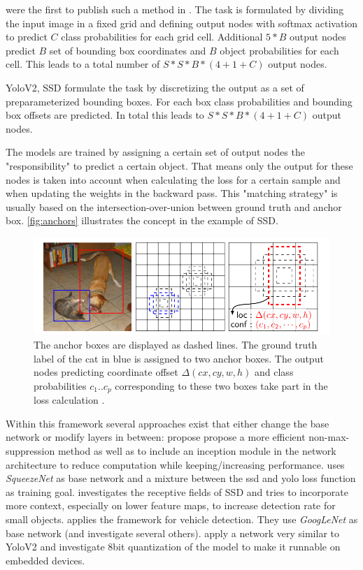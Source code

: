 	\citeauthor{Redmon} were the first to publish such a method in \cite{Redmon}. The task is formulated by dividing the input image in a fixed grid and defining output nodes with softmax activation to predict $C$ class probabilities for each grid cell. Additional $5*B$ output nodes predict $B$ set of bounding box coordinates and $B$ object probabilities for each cell. This leads to a total number of $S*S*B*(4 + 1 + C)$ output nodes. 
	
	YoloV2, SSD  formulate the task by discretizing the output as a set of preparameterized bounding boxes. For each box class probabilities and bounding box offsets are predicted. In total this leads to $S*S*B*(4 + 1 + C)$ output nodes. 
	
	The models are trained by assigning a certain set of output nodes the "responsibility" to predict a certain object. That means only the output for these nodes is taken into account when calculating the loss for a certain sample and when updating the weights in the backward pass. This "matching strategy" is usually based on the intersection-over-union between ground truth and anchor box. \autoref{fig:anchors} illustrates the concept in the example of SSD.  
	
	\begin{figure}[hbtp]
		
		\centering
		\captionsetup{justification=raggedright,singlelinecheck=false}
		\includegraphics[width=0.8\linewidth]{fig/anchors}
		\caption{The anchor boxes are displayed as dashed lines. The ground truth label of the cat in blue is assigned to two anchor boxes. The output nodes predicting coordinate offset $\Delta(cx, cy, w,h)$ and class probabilities $c_1 .. c_p$ corresponding to these two boxes take part in the loss calculation \cite{Liu}.}
		\label{fig:anchors}
		
	\end{figure}
	
	Within this framework several approaches exist that either change the base network or modify layers in between: \cite{ChengchengNing2017} propose propose a more efficient non-max-suppression method as well as to include an inception module in the network architecture to reduce computation while keeping/increasing performance. \cite{Wu} uses \textit{SqueezeNet} as base network and a mixture between the ssd and yolo loss function as training goal. \cite{Xiang} investigates the receptive fields of SSD and tries to incorporate more context, especially on lower feature maps, to increase detection rate for small objects.\cite{Linb} applies the framework for vehicle detection. They use \textit{GoogLeNet} as base network (and investigate several others).\cite{TripathiSanDiego} apply a network very similar to YoloV2 and investigate 8bit quantization of the model to make it runnable on embedded devices.
	
